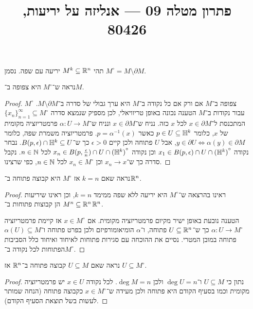 
\title{פתרון מטלה 09 --- אנליזה על יריעות, 80426}

\DeclareMathOperator{\vol}{vol}


\maketitle
\maketitleprint[blue]

\question{}
תהי $M^k \subseteq \mathbb{R}^n$ יריעה עם שפה.
נסמן $M^\circ = M \setminus \partial M$.

\subquestion{}
נראה ש־$M^\circ$ היא צפופה ב־$M$.
\begin{proof}
	$M^\circ$ צפופה ב־$M$ אם ורק אם כל נקודה ב־$M$ היא ערך גבולי של סדרה ב־$M \setminus \partial M$.
	עבור נקודות ב־$M$ הטענה נכונה באופן טריוויאלי, לכן מספיק שנמצא סדרה ${\{ x_n \}}_{n = 1}^\infty \subseteq M^\circ$ המתכנסת ל־$x \in \partial M$ לכל $x$ כזה.
	נניח ש־$x \in \partial M$ ונניח ש־$\alpha : U \to M$ פרמטריזציה מקומית של $x$, כלומר $p \in U \subseteq \mathbb{H}^k$ כאשר $p = \alpha^{-1}(x)$.
	פרמטריזציה משמרת שפה, כלומר $y \in \partial U \iff \alpha(y) \in \partial M$, אבל $U$ פתוחה ולכן קיים $\epsilon > 0$ כך ש־$B(p, \epsilon) \cap \mathbb{H}^k \subseteq U$.
	נבחר נקודה $x_1 \in B(p, \epsilon) \cap U \cap {(\mathbb{H}^k)}^\circ$ וכן נקודה $x_n \in B(p, \frac{\epsilon}{n}) \cap U \cap {(\mathbb{H}^k)}^\circ$ לכל $n \in \mathbb{N}$.
	נקבל סדרה כך ש־$x_n \to x$ וכן $x_n \in M^\circ$ לכל $n \in \mathbb{N}$, כפי שרצינו.
\end{proof}

\subquestion{}
נראה שאם $k = n$ אז $M^\circ$ היא קבוצה פתוחה ב־$\mathbb{R}^n$.
\begin{proof}
	ראינו בהרצאה ש־$M^\circ$ היא יריעה ללא שפה ממימד $k = n$, וכן ראינו שיריעות $M^n \subseteq \mathbb{R}^n$ הן קבוצות פתוחות ב־$\mathbb{R}^n$.

	הטענה נובעת באופן ישיר מקיום פרמטריזציה מקומית.
	אם $x \in M^\circ$ אז קיימת פרמטריזציה $\alpha : U \to M^\circ$ כך ש־$U \subseteq \mathbb{R}^n$ פתוחה, ו־$\alpha$ הומיאומורפיזם ולכן בפרט פתוחה ו־$\alpha(U) \subseteq M$ פתוחה במובן המטרי.
	נסיים את ההוכחה עם סגירות פתוחות לאיחוד ואיחוד כלל הסביבות הפתוחות לכל נקודה ב־$M^\circ$.
\end{proof}

\subquestion{}
נראה שאם $U \subseteq M$ קבוצה פתוחה ב־$\mathbb{R}^n$ אז $U \subseteq M^\circ$.
\begin{proof}
	נתון כי $U \subseteq M$ ו־$\deg U = n$ ולכן $\deg M = n$.
	לכל נקודה $x \in U$ יש פרמטריזציה מקומית וכמו בסעיף הקודם היא פתוחה ולכן מעידה ש־$x \in M^\circ$ כקבוצה פתוחה (הנחה שמותר לעשות בשל תוצאת הסעיף הקודם).
\end{proof}

